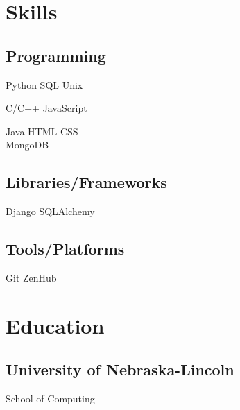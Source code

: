 \documentclass[]{latex/resume}
\begin{document}
\begin{minipage}[t]{0.25\textwidth} 


\section{Skills}
    \subsection{Programming}
        \sectionsep
            Python \textbullet{} SQL \textbullet{} Unix \\

        \sectionsep
        
            C/C++ \textbullet{} JavaScript \\
        
        \sectionsep
        
            Java \textbullet{} HTML \textbullet{} CSS \\ MongoDB \\
    
    \sectionsep
    \sectionsep
    
    \subsection{Libraries/Frameworks}
        \sectionsep
        Django \textbullet{} SQLAlchemy \\
    
    \sectionsep
    \sectionsep
    
    \subsection{Tools/Platforms}
        \sectionsep
        Git \textbullet{} ZenHub \\

\sectionsep


\section{Education} 
    \subsection{University of Nebraska-Lincoln}
    School of Computing \\


\end{minipage}
\end{document}
